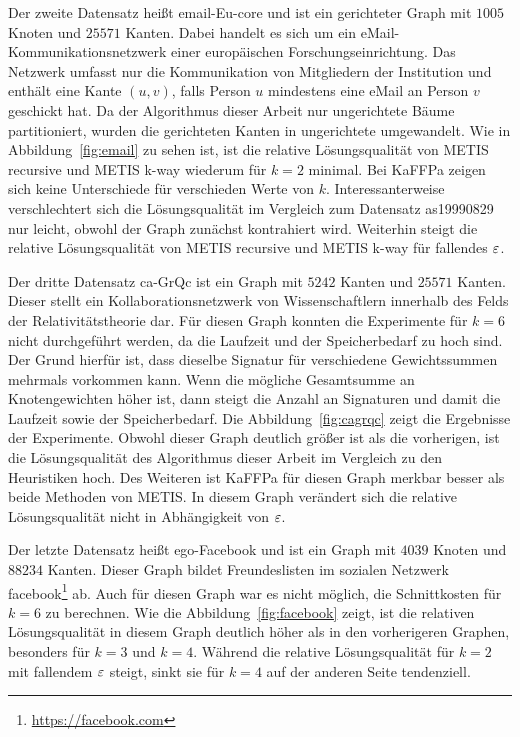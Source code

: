 Der zweite Datensatz heißt email-Eu-core und ist ein gerichteter Graph mit $1005$ Knoten und $25571$ Kanten.
Dabei handelt es sich um ein eMail\hyp Kommunikationsnetzwerk einer europäischen Forschungseinrichtung.
Das Netzwerk umfasst nur die Kommunikation von Mitgliedern der Institution und enthält eine Kante $(u, v)$, falls Person $u$ mindestens eine eMail an Person $v$ geschickt hat.
Da der Algorithmus dieser Arbeit nur ungerichtete Bäume partitioniert, wurden die gerichteten Kanten in ungerichtete umgewandelt.
Wie in Abbildung~\ref{fig:email} zu sehen ist, ist die relative Lösungsqualität von METIS recursive und METIS k-way wiederum für $k=2$ minimal.
Bei KaFFPa zeigen sich keine Unterschiede für verschieden Werte von $k$.
Interessanterweise verschlechtert sich die Lösungsqualität im Vergleich zum Datensatz as19990829 nur leicht, obwohl der Graph zunächst kontrahiert wird.
Weiterhin steigt die relative Lösungsqualität von METIS recursive und METIS k-way für fallendes $\varepsilon$.

Der dritte Datensatz ca-GrQc ist ein Graph mit $5242$ Kanten und $25571$ Kanten.
Dieser stellt ein Kollaborationsnetzwerk von Wissenschaftlern innerhalb des Felds der Relativitätstheorie dar.
Für diesen Graph konnten die Experimente für $k=6$ nicht durchgeführt werden, da die Laufzeit und der Speicherbedarf zu hoch sind. 
Der Grund hierfür ist, dass dieselbe Signatur für verschiedene Gewichtssummen mehrmals vorkommen kann. 
Wenn die mögliche Gesamtsumme an Knotengewichten höher ist, dann steigt die Anzahl an Signaturen und damit die Laufzeit sowie der Speicherbedarf.
Die Abbildung~\ref{fig:cagrqc} zeigt die Ergebnisse der Experimente.
Obwohl dieser Graph deutlich größer ist als die vorherigen, ist die Lösungsqualität des Algorithmus dieser Arbeit im Vergleich zu den Heuristiken hoch.
Des Weiteren ist KaFFPa für diesen Graph merkbar besser als beide Methoden von METIS.
In diesem Graph verändert sich die relative Lösungsqualität nicht in Abhängigkeit von $\varepsilon$.

Der letzte Datensatz heißt ego-Facebook und ist ein Graph mit $4039$ Knoten und $88234$ Kanten.
Dieser Graph bildet Freundeslisten im sozialen Netzwerk facebook\footnote{\url{https://facebook.com}} ab.
Auch für diesen Graph war es nicht möglich, die Schnittkosten für $k=6$ zu berechnen.
Wie die Abbildung~\ref{fig:facebook} zeigt, ist die relativen Lösungsqualität in diesem Graph deutlich höher als in den vorherigeren Graphen, besonders für $k=3$ und $k=4$.
Während die relative Lösungsqualität für $k=2$ mit fallendem $\varepsilon$ steigt, sinkt sie für $k=4$ auf der anderen Seite tendenziell.

